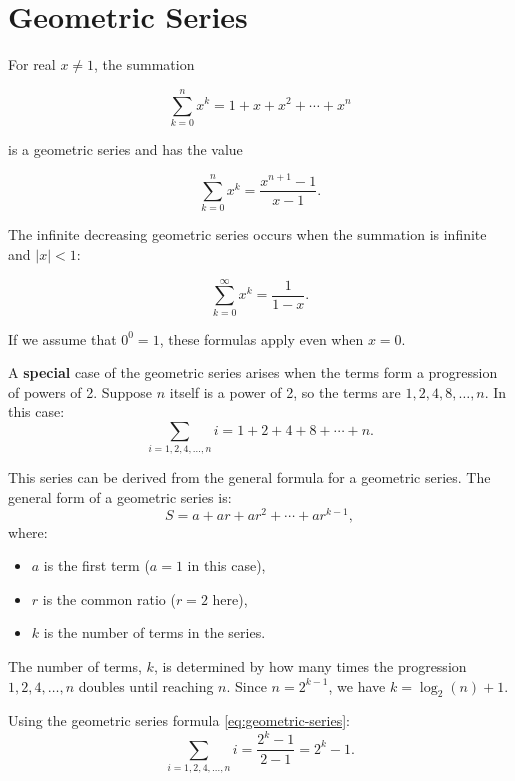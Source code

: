         \section*{Geometric Series}
        For real $x \neq 1$, the summation
        
        \[
            \sum_{k=0}^n x^k=1+x+x^2+\cdots+x^n
        \]
        
        is a geometric series and has the value
        
        \begin{equation}
            \sum_{k=0}^n x^k=\frac{x^{n+1}-1}{x-1} . \label{eq:geometric-series}
        \end{equation}
        
        The infinite decreasing geometric series occurs when the summation is infinite and $|x|<1$:
        
        \begin{equation}
            \sum_{k=0}^{\infty} x^k=\frac{1}{1-x} . \label{eq:infinite-geometric-series}
        \end{equation}
        
        If we assume that $0^0=1$, these formulas apply even when $x=0$.
        
        A \textbf{special} case of the geometric series arises when the terms form a progression of powers of 2. Suppose $n$ itself is a power of 2, so the terms are \(1, 2, 4, 8, \ldots, n\). In this case:
        \[
            \sum_{i=1,2,4,\ldots,n} i = 1 + 2 + 4 + 8 + \cdots + n.
        \]
        
        This series can be derived from the general formula for a geometric series. The general form of a geometric series is:
        \[
            S = a + ar + ar^2 + \cdots + ar^{k-1},
        \]
        where:
        \begin{itemize}
            \item \(a\) is the first term (\(a=1\) in this case),
            \item \(r\) is the common ratio (\(r=2\) here),
            \item \(k\) is the number of terms in the series.
        \end{itemize}
        The number of terms, \(k\), is determined by how many times the progression \(1, 2, 4, \ldots, n\) doubles until reaching \(n\). Since \(n = 2^{k-1}\), we have \(k = \log_2(n) + 1\).
        
        Using the geometric series formula \eqref{eq:geometric-series}:
        \[
            \sum_{i=1,2,4,\ldots,n} i = \frac{2^k - 1}{2 - 1} = 2^k - 1.
        \]
        
